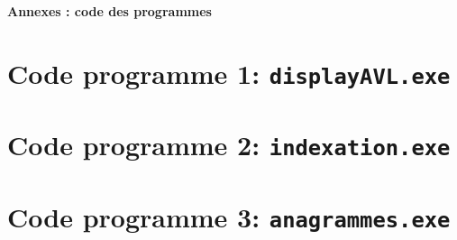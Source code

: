 \documentclass{article} %
\begin{document}
\nocite{*}




\vspace*{1cm}

\textbf{\LARGE Annexes : code des programmes}

\begin{appendix}
  \section{Code programme 1: \texttt{displayAVL.exe}}
  
  \vspace{1cm}
  

  \section{Code programme 2: \texttt{indexation.exe}}
  

  \section{Code programme 3: \texttt{anagrammes.exe}}
  
\end{appendix}
\end{document}
